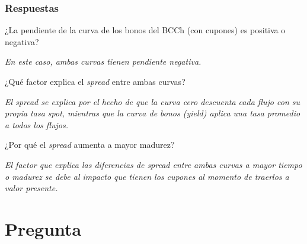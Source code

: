 \documentclass{beamer}
\newif\ifpresentacion
\newcommand{\pausa}{\ifpresentacion\pause\fi}
\begin{document}
\begin{frame}
  \frametitle{Respuestas }
  \begin{block}{¿La pendiente de la curva de los bonos del BCCh (con cupones) es positiva o negativa?}
    \pausa
    \textit{En este caso, ambas curvas tienen pendiente negativa.}
    \pausa
  \end{block}
  
  \begin{block}{¿Qué factor explica el \textit{spread} entre ambas curvas?}
    \pausa
    \textit{El \textit{spread} se explica por el hecho de que la curva cero descuenta
     cada flujo con su propia tasa spot, mientras que la curva de bonos (yield) aplica 
     una tasa promedio a todos los flujos.}
    \pausa
  \end{block} 
  
  \begin{block}{¿Por qué el \textit{spread} aumenta a mayor madurez?}
    \pausa
    \textit{El factor que explica las diferencias de \textit{spread} entre ambas 
    curvas a mayor tiempo o madurez se debe al impacto que tienen los cupones al momento de traerlos a valor presente.}
    \pausa
  \end{block}

\end{frame}

\section{Pregunta }
\end{document}
